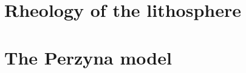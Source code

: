 \section{Rheology of the lithosphere}


\newpage
\section{The Perzyna model}\label{sec:perzyna}













